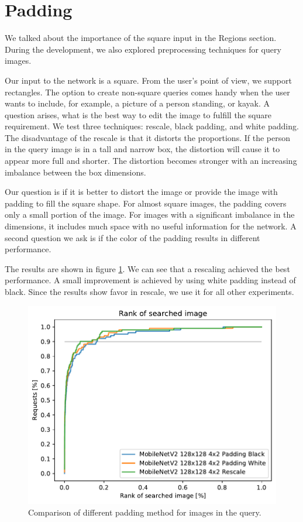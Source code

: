 \section{Padding}

We talked about the importance of the square input in the Regions section. During the development, we also explored preprocessing techniques for query images.

Our input to the network is a square. From the user's point of view, we support rectangles. The option to create non-square queries comes handy when the user wants to include, for example, a picture of a person standing, or kayak. A question arises, what is the best way to edit the image to fulfill the square requirement. We test three techniques: rescale, black padding, and white padding. The disadvantage of the rescale is that it distorts the proportions. If the person in the query image is in a tall and narrow box, the distortion will cause it to appear more full and shorter. The distortion becomes stronger with an increasing imbalance between the box dimensions. 

Our question is if it is better to distort the image or provide the image with padding to fill the square shape. For almost square images, the padding covers only a small portion of the image. For images with a significant imbalance in the dimensions, it includes much space with no useful information for the network. A second question we ask is if the color of the padding results in different performance.

The results are shown in figure \ref{fig:padding}. We can see that a rescaling achieved the best performance. A small improvement is achieved by using white padding instead of black. Since the results show favor in rescale, we use it for all other experiments.

\begin{figure}
    \centering
    \includegraphics[width=0.8\linewidth]{graphs/bf57efafbbbc7b5a1744054d87d4ecfa381c9eaf2459186904190d97bcb99a81.pdf}
    \caption{Comparison of different padding method for images in the query.}
    \label{fig:padding}
\end{figure}

